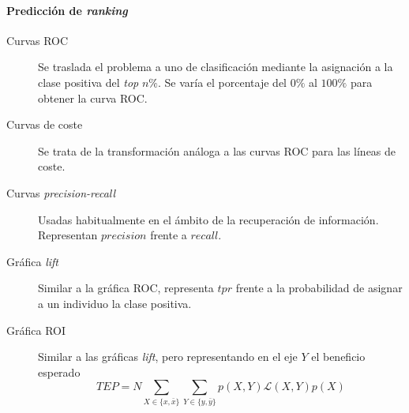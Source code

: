\paragraph{Predicción de \textit{ranking}} 	
	\begin{description}
		\item[Curvas ROC] Se traslada el problema a uno de 
		clasificación mediante la asignación a la clase 
		positiva del \textit{top} $n\%$. Se varía el 
		porcentaje del $0\%$ al $100\%$ para obtener la curva 
		ROC.
		\item[Curvas de coste] Se trata de la transformación 
		análoga a las curvas ROC para las líneas de coste.
		\item[Curvas \textit{precision-recall}] Usadas 
		habitualmente en el ámbito de la recuperación de 
		información. Representan $precision$ frente a 
		$recall$.
		\item[Gráfica \textit{lift}] Similar a la gráfica 
		ROC, representa $tpr$ frente a la probabilidad de 
		asignar a un individuo la clase positiva. 
		\item[Gráfica ROI] Similar a las gráficas 
		\textit{lift}, pero representando en el eje $Y$ el 
		beneficio esperado 
		\[	TEP = N \sum\limits_{X \in \{x,\bar{x}\}}
					\sum\limits_{Y \in \{y,\bar{y}\}}
						p(X,Y) \mathcal{L}(X,Y) p(X) \]
	\end{description}


